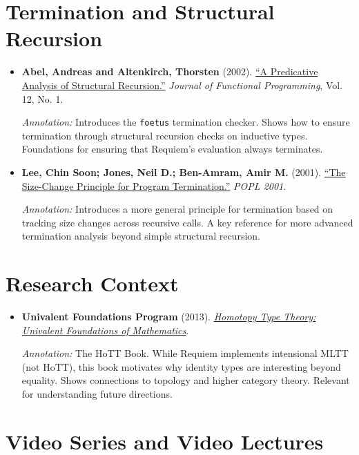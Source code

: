 \documentclass[11pt]{article}
\begin{document}
\section{Termination and Structural Recursion}

\begin{itemize}[leftmargin=*]
\item \textbf{Abel, Andreas and Altenkirch, Thorsten} (2002). \href{https://www.cse.chalmers.se/~abela/jfp02.pdf}{``A Predicative Analysis of Structural Recursion.''} \emph{Journal of Functional Programming}, Vol. 12, No. 1.

\textit{Annotation:} Introduces the \texttt{foetus} termination checker. Shows how to ensure termination through structural recursion checks on inductive types. Foundations for ensuring that Requiem's evaluation always terminates.

\item \textbf{Lee, Chin Soon; Jones, Neil D.; Ben-Amram, Amir M.} (2001). \href{https://dl.acm.org/doi/10.1145/360204.360210}{``The Size-Change Principle for Program Termination.''} \emph{POPL 2001}.

\textit{Annotation:} Introduces a more general principle for termination based on tracking size changes across recursive calls. A key reference for more advanced termination analysis beyond simple structural recursion.
\end{itemize}

\section{Research Context}

\begin{itemize}[leftmargin=*]
\item \textbf{Univalent Foundations Program} (2013). \href{https://homotopytypetheory.org/book/}{\emph{Homotopy Type Theory: Univalent Foundations of Mathematics}}.

\textit{Annotation:} The HoTT Book. While Requiem implements intensional MLTT (not HoTT), this book motivates why identity types are interesting beyond equality. Shows connections to topology and higher category theory. Relevant for understanding future directions.

\end{itemize}

\section{Video Series and Video Lectures}
\end{document}
